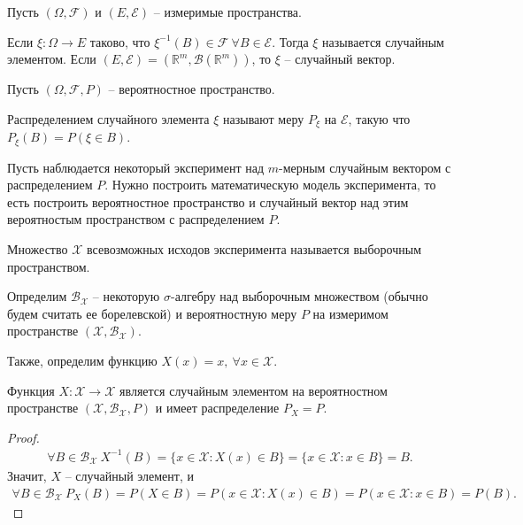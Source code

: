 Пусть $\displaystyle ( \Omega ,\mathcal{F})$ и $\displaystyle ( E,\mathcal{E})$ -- измеримые пространства.
\begin{definition}
	Если $\displaystyle \xi :\Omega \rightarrow E$ таково, что $\displaystyle \xi ^{-1}( B) \in \mathcal{F} \ \forall B\in \mathcal{E}$. Тогда $\displaystyle \xi $ называется случайным элементом. Если $\displaystyle ( E,\mathcal{E}) =\left(\mathbb{R}^{m} ,\mathcal{B}\left(\mathbb{R}^{m}\right)\right)$, то $\displaystyle \xi $ -- случайный вектор. 
\end{definition}
Пусть $\displaystyle ( \Omega ,\mathcal{F} ,P)$ -- вероятностное пространство.
\begin{definition}
	Распределением случайного элемента $\displaystyle \xi $ называют меру $\displaystyle P_{\xi }$ на $\displaystyle \mathcal{E}$, такую что $\displaystyle P_{\xi }( B) =P( \xi \in B)$.
\end{definition}
Пусть наблюдается некоторый эксперимент над $\displaystyle m$-мерным случайным вектором с распределением $\displaystyle P$. Нужно построить математическую модель эксперимента, то есть построить вероятностное пространство и случайный вектор над этим вероятностым пространством с распределением $\displaystyle P$.
\begin{definition}
	Множество $\displaystyle \mathcal{X}$ всевозможных исходов эксперимента называется выборочным пространством.
\end{definition}
    Определим $\displaystyle \mathcal{B}_{\mathcal{X}}$ -- некоторую $\displaystyle \sigma $-алгебру над выборочным множеством (обычно будем считать ее борелевской) и вероятностную меру $\displaystyle P$ на измеримом пространстве $\displaystyle (\mathcal{X} ,\mathcal{B}_{\mathcal{X}})$.
    
    Также, определим функцию $\displaystyle X( x) =x,\ \forall x\in \mathcal{X}$.
\begin{proposition}
	Функция $\displaystyle X:\mathcal{X}\rightarrow \mathcal{X}$ является случайным элементом на вероятностном пространстве $\displaystyle (\mathcal{X} ,\mathcal{B}_{\mathcal{X}} ,P)$ и имеет распределение $\displaystyle P_{X} =P$.
\end{proposition}
\begin{proof}
    \begin{gather*}
        \forall B\in \mathcal{B}_{\mathcal{X}} \ X^{-1}( B) =\{x\in \mathcal{X} :X( x) \in B\} =\{x\in \mathcal{X} :x\in B\} = B.
    \end{gather*}
    Значит, $X$ -- случайный элемент, и
    \begin{gather*}
        \forall B\in \mathcal{B}_{\mathcal{X}} \ P_{X}( B) =P( X\in B) =P( x\in \mathcal{X} :X( x) \in B) =P( x\in \mathcal{X} :x\in B) =P( B).
    \end{gather*}
\end{proof}

